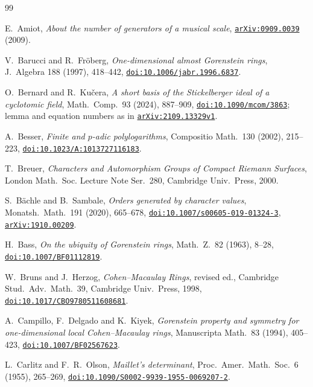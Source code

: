 \documentclass[11pt,a4paper]{article}
\theoremstyle{definition}
\begin{document}
\begin{thebibliography}{99}\small\raggedright\setlength{\itemsep}{0pt}\setlength{\parskip}{0pt}
 E.~Amiot, \emph{About the number of generators of a musical scale}, \href{https://arxiv.org/abs/0909.0039}{\texttt{arXiv:0909.0039}} (2009).

 V.~Barucci and R.~Fröberg, \emph{One-dimensional almost Gorenstein rings}, J.~Algebra 188 (1997), 418--442, \href{https://doi.org/10.1006/jabr.1996.6837}{\texttt{doi:10.1006/jabr.1996.6837}}.

 O.~Bernard and R.~Kučera, \emph{A short basis of the Stickelberger ideal of a cyclotomic field}, Math.~Comp.~93 (2024), 887--909, \href{https://doi.org/10.1090/mcom/3863}{\texttt{doi:10.1090/mcom/3863}}; lemma and equation numbers as in \href{https://arxiv.org/abs/2109.13329}{\texttt{arXiv:2109.13329v1}}.

 A.~Besser, \emph{Finite and $p$-adic polylogarithms}, Compositio Math.~130 (2002), 215--223, \href{https://doi.org/10.1023/A:1013727116183}{\texttt{doi:10.1023/A:1013727116183}}.

 T.~Breuer, \emph{Characters and Automorphism Groups of Compact Riemann Surfaces}, London Math.~Soc.
Lecture Note Ser.~280, Cambridge Univ.~Press, 2000.

 S.~B\"achle and B.~Sambale, \emph{Orders generated by character values}, Monatsh.~Math.~191 (2020), 665--678, \href{https://doi.org/10.1007/s00605-019-01324-3}{\texttt{doi:10.1007/s00605-019-01324-3}}, \href{https://arxiv.org/abs/1910.00209}{\texttt{arXiv:1910.00209}}.

 H.~Bass, \emph{On the ubiquity of Gorenstein rings}, Math.~Z.~82 (1963), 8--28, \href{https://doi.org/10.1007/BF01112819}{\texttt{doi:10.1007/BF01112819}}.

 W.~Bruns and J.~Herzog, \emph{Cohen--Macaulay Rings}, revised ed., Cambridge Stud.~Adv.~Math.~39, Cambridge Univ.~Press, 1998, \href{https://doi.org/10.1017/CBO9780511608681}{\texttt{doi:10.1017/CBO9780511608681}}.

 A.~Campillo, F.~Delgado and K.~Kiyek, \emph{Gorenstein property and symmetry for one-dimensional local Cohen--Macaulay rings}, Manuscripta Math.~83 (1994), 405--423, \href{https://doi.org/10.1007/BF02567623}{\texttt{doi:10.1007/BF02567623}}.

 L.~Carlitz and F.~R.~Olson, \emph{Maillet's determinant}, Proc.~Amer.~Math.~Soc.~6 (1955), 265--269, \href{https://doi.org/10.1090/S0002-9939-1955-0069207-2}{\texttt{doi:10.1090/S0002-9939-1955-0069207-2}}.


\end{thebibliography}
\end{document}
